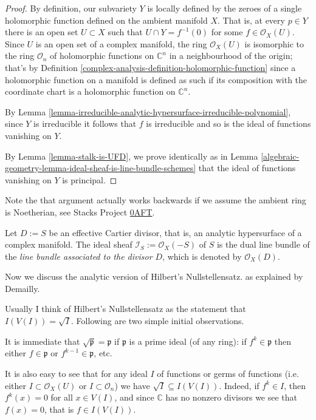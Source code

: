 \begin{proof}
By definition, our subvariety $Y$ is locally defined by the zeroes of a single 
holomorphic function defined on the ambient manifold $X$. That is,
at every $p\in Y$ there is an open set $U\subset X$ such that $U\cap
Y=f^{-1}(0)$ for some $f\in\mathcal{O}_X(U)$. Since $U$ is an open set of a
complex manifold, the ring $\mathcal{O}_X(U)$ is isomorphic to the ring
$\mathcal{O}_n$ of holomorphic functions on $\mathbb{C}^n$ in a neighbourhood of
the origin; that's by Definition 
\ref{complex-analysis-definition-holomorphic-function} since a
holomorphic function on a manifold is defined as such if its composition with
the coordinate chart is a holomorphic function on $\mathbb{C}^n$.

By Lemma
\ref{lemma-irreducible-analytic-hypersurface-irreducible-polynomial}, since $Y$
is irreducible it follows that $f$ is irreducible and so is the ideal of
functions vanishing on $Y$.

By Lemma \ref{lemma-stalk-is-UFD}, we prove identically as in Lemma 
\ref{algebraic-geometry-lemma-ideal-sheaf-is-line-bundle-schemes} 
that the ideal of functions
vanishing on $Y$ is principal.
\end{proof}

\noindent
Note the that argument actually works backwards if we assume
the ambient ring is Noetherian,
see Stacks Project \href{https://stacks.math.columbia.edu/tag/0AFT}{0AFT}.

\begin{definition}
\label{definition-sheaf-associated-to-effective-Cartier-divisor}
Let $D:=S$ be an effective Cartier divisor, that is, an analytic hypersurface of
a complex manifold. The ideal sheaf $\mathcal{I}_S:=\mathcal{O}_X(-S)$ of $S$ is
the dual line bundle of the {\it line bundle associated to the divisor $D$},
which is denoted by $\mathcal{O}_X(D)$.
\end{definition}

\medskip\noindent
Now we discuss the analytic version of Hilbert's Nullstellensatz.
as explained by Demailly.

\noindent
Usually I think of Hilbert's Nullstellensatz
as the statement that $I(V(I))=\sqrt{I}$.
Following are two simple initial observations.

It is immediate that $\sqrt{\mathfrak{p}}=\mathfrak{p}$
if $\mathfrak{p}$ is a prime ideal (of any ring):
if  $f^k \in \mathfrak{p}$ then
either $f \in \mathfrak{p}$ or $f^{k-1}\in \mathfrak{p}$,
etc.

It is also easy to see that
for any ideal $I$ of functions or germs of functions
(i.e. either  $I \subset \mathcal{O}_X(U)$
or $I \subset \mathcal{O}_n$)
we have
$\sqrt{I}\subseteq I(V(I))$.
Indeed, if $f^k \in I$,
then $f^k(x)=0$ for all $x \in V(I)$,
and since $\mathbb{C}$ has no nonzero divisors
we see that $f(x)=0$,
that is $f \in I(V(I))$.

